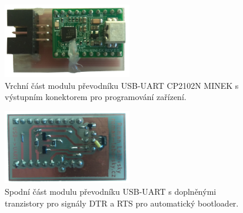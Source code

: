 \begin{figure}[H]
    \centering
    \includegraphics[width=0.5\textwidth]{images/prevodnik-usb-uart-cp2102n/prevodnik-cp2102n-modul-vrchni-cast.png}
    \caption[Vrchní část modulu převodníku USB-UART.]{Vrchní část modulu převodníku USB-UART CP2102N MINEK s výstupním konektorem pro programování zařízení.}
    \label{fig:prevodnik-cp2102n-modul-vrchni-cast}
\end{figure}


\begin{figure}[H]
    \centering
    \includegraphics[width=0.5\textwidth]{images/prevodnik-usb-uart-cp2102n/prevodnik-cp2102n-modul-spodni-cast.png}
    \caption[Spodní část modulu převodníku USB-UART.]{Spodní část modulu převodníku USB-UART s doplněnými tranzistory pro signály DTR a RTS pro automatický bootloader.}
    \label{fig:prevodnik-cp2102n-modul-spodni-cast}
\end{figure}